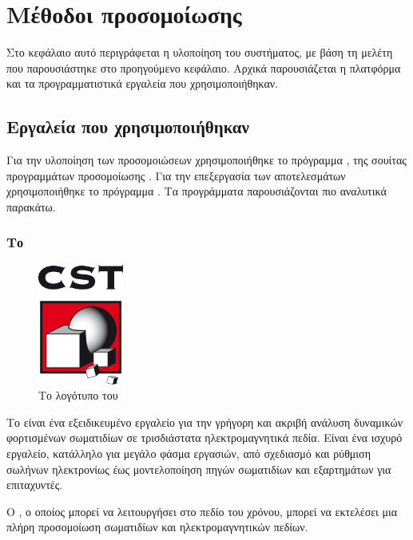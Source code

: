 \chapter{Μέθοδοι προσομοίωσης}
Στο κεφάλαιο αυτό περιγράφεται η υλοποίηση του συστήματος, με βάση τη μελέτη που παρουσιάστηκε στο προηγούμενο κεφάλαιο. 
Αρχικά παρουσιάζεται η πλατφόρμα και τα προγραμματιστικά εργαλεία που χρησιμοποιήθηκαν. 

\section{Εργαλεία που χρησιμοποιήθηκαν}
Για την υλοποίηση των προσομοιώσεων χρησιμοποιήθηκε το πρόγραμμα , της σουίτας προγραμμάτων προσομοίωσης . 
Για την επεξεργασία των αποτελεσμάτων χρησιμοποιήθηκε το πρόγραμμα . 
Τα προγράμματα παρουσιάζονται πιο αναλυτικά παρακάτω.

\subsection{Το }
\begin{figure}[tph]
\includegraphics[width=0.25\textwidth]{images/CST-logo.png}
\centering
\caption{Το λογότυπο του }
\label{img:CSTlogo}
\end{figure}
Το  είναι ένα εξειδικευμένο εργαλείο για την γρήγορη και ακριβή ανάλυση δυναμικών φορτισμένων σωματιδίων σε τρισδιάστατα ηλεκτρομαγνητικά πεδία.
Είναι ένα ισχυρό εργαλείο, κατάλληλο για μεγάλο φάσμα εργασιών, από σχεδιασμό  και ρύθμιση σωλήνων ηλεκτρονίως έως μοντελοποίηση πηγών σωματιδίων και εξαρτημάτων για επιταχυντές.

Ο , ο οποίος μπορεί να λειτουργήσει στο πεδίο του χρόνου, μπορεί να εκτελέσει μια πλήρη προσομοίωση σωματιδίων και ηλεκτρομαγνητικών πεδίων.

